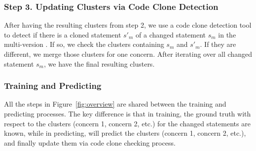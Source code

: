 
\subsubsection{{\bf Step 3. Updating Clusters via Code Clone Detection}}

After having the resulting clusters from step 2, we use a code clone
detection tool to detect if there is a cloned statement $s'_m$ of a
changed statement $s_m$ in the multi-version {\mvpdg}. If so, we check
the clusters containing $s_m$ and $s'_m$. If they are different,
we merge those clusters for one concern. After iterating over
all changed statement $s_m$, we have the final resulting clusters.


\subsubsection*{Training and Predicting}
All the steps in Figure~\ref{fig:overview} are shared between the
training and predicting processes. The key difference is that in
training, the ground truth with respect to the clusters (concern
1, concern 2, etc.) for the changed statements are known, while in
predicting, {\tool} will predict the clusters (concern 1, concern 2,
etc.), and finally update them via code clone checking
process.


